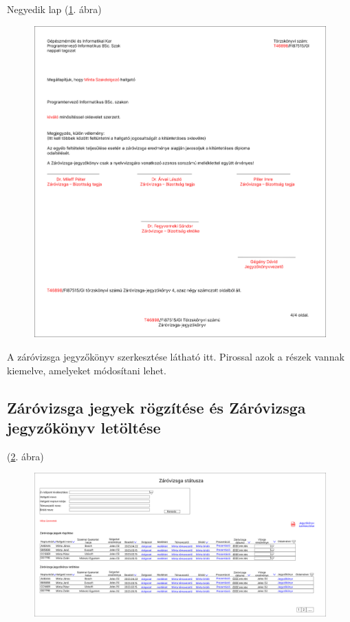 \documentclass[a4paper,12pt]{article}
\begin{document}
Negyedik lap (\ref{fig:Zv_Report4}. ábra)

\begin{figure}
	\centering
	\includegraphics[width=\textwidth]{images/Web_pages/Zv_Report4.png}
	\caption{}
	\label{fig:Zv_Report4}
\end{figure}

A záróvizsga jegyzőkönyv szerkesztése látható itt. Pirossal azok a részek vannak kiemelve, amelyeket módosítani lehet.

\subsection{Záróvizsga jegyek rögzítése és Záróvizsga jegyzőkönyv letöltése}

(\ref{fig:Zv_Status}. ábra)

\begin{figure}
	\centering
	\includegraphics[width=\textwidth]{images/Web_pages/Zv_Status.png}
	\caption{}
	\label{fig:Zv_Status}
\end{figure}
\end{document}

